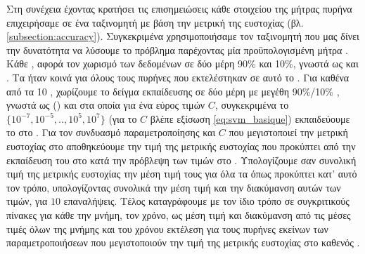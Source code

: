 Στη συνέχεια έχοντας κρατήσει τις επισημειώσεις κάθε στοιχείου της μήτρας πυρήνα επιχειρήσαμε  σε ένα ταξινομητή  με βάση την μετρική της ευστοχίας (βλ. \ref{subsection:accuracy}).
Συγκεκριμένα χρησιμοποιήσαμε τον ταξινομητή  που μας δίνει την δυνατότητα να λύσουμε το πρόβλημα  παρέχοντας μία προϋπολογισμένη μήτρα .
Κάθε , αφορά τον χωρισμό των δεδομένων σε δύο μέρη 90\% και 10\%, γνωστά ως  και .
Τα  ήταν κοινά για όλους τους πυρήνες που εκτελέστηκαν σε αυτό το .
Για καθένα από τα 10 , χωρίζουμε το δείγμα εκπαίδευσης σε δύο μέρη με μεγέθη 90\%/10\% , γνωστά ως () και στα οποία για ένα εύρος τιμών $C$, συγκεκριμένα το $\{10^{-7}, 10^{-5}, .., 10^{5}, 10^{7}\}$ (για το $C$ βλέπε εξίσωση \ref{eq:svm_basique}) εκπαιδεύουμε το  στο .
Για τον συνδυασμό παραμετροποίησης και $C$ που μεγιστοποιεί την μετρική ευστοχίας στο  αποθηκεύουμε την τιμή της μετρικής ευστοχίας που προκύπτει από την εκπαίδευση του  στο  κατά την πρόβλεψη των τιμών στο .
Υπολογίζουμε σαν συνολική τιμή της μετρικής ευστοχίας την μέση τιμή τους για όλα τα  όπως προκύπτει κατ' αυτό τον τρόπο, υπολογίζοντας συνολικά την μέση τιμή και την διακύμανση αυτών των τιμών, για $10$ επαναλήψεις.
Τέλος καταγράφουμε με τον ίδιο τρόπο σε συγκριτικούς πίνακες για κάθε  την μνήμη, τον χρόνο, ως μέση τιμή και διακύμανση από τις μέσες τιμές όλων της μνήμης και του χρόνου εκτέλεση για τους πυρήνες εκείνων των παραμετροποιήσεων που μεγιστοποιούν την τιμή της μετρικής ευστοχίας στο  καθενός .

